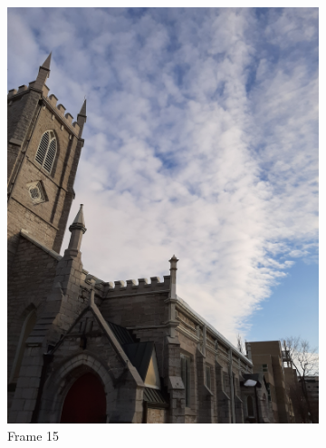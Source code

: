 \documentclass[conference]{IEEEtran}
\begin{document}
\begin{figure}[!h]
\begin{subfigure}[b]{0.2\linewidth}
    \includegraphics[width=\linewidth, angle = -90]{images/frame15.jpg}
    \caption{Frame 15}
  \end{subfigure}
  \begin{subfigure}[b]{0.2\linewidth}

\end{subfigure}
\end{figure}
\end{document}

